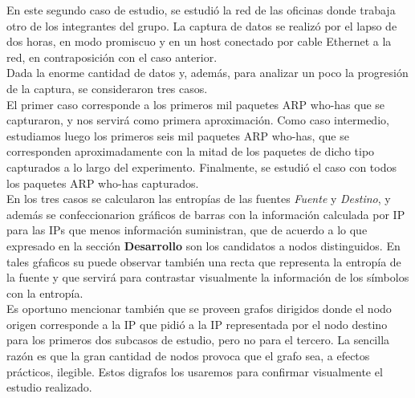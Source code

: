 \indent \indent  En este segundo caso de estudio, se estudió la red de las oficinas donde trabaja otro de los integrantes del grupo. La captura de datos se realizó por el lapso de dos horas, en modo promiscuo y en un host conectado por cable Ethernet a la red, en contraposición con el caso anterior.\\
\indent Dada la enorme cantidad de datos y, además, para analizar un poco la progresión de la captura, se consideraron tres casos.\\
\indent El primer caso corresponde a los primeros mil paquetes ARP who-has que se capturaron, y nos servirá como primera aproximación. Como caso intermedio, estudiamos luego los primeros seis mil paquetes ARP who-has, que se corresponden aproximadamente con la mitad de los paquetes de dicho tipo capturados a lo largo del experimento. Finalmente, se estudió el caso con todos los paquetes ARP who-has capturados.\\
\indent En los tres casos se calcularon las entropías de las fuentes \textit{Fuente} y \textit{Destino}, y además se confeccionarion gráficos de barras con la información calculada por IP para las IPs que menos información suministran, que de acuerdo a lo que expresado en la sección \textbf{Desarrollo} son los candidatos a  nodos distinguidos. En tales gŕaficos su puede observar también una recta que representa la entropía de la fuente y que servirá para contrastar visualmente la información de los símbolos con la entropía.\\
\indent Es oportuno mencionar también que se proveen grafos dirigidos donde el nodo origen corresponde a la IP que pidió a la IP representada por el nodo destino para los primeros dos subcasos de estudio, pero no para el tercero. La sencilla razón es que la gran cantidad de nodos provoca que el grafo sea, a efectos prácticos, ilegible. Estos digrafos los usaremos para confirmar visualmente el estudio realizado.\\

